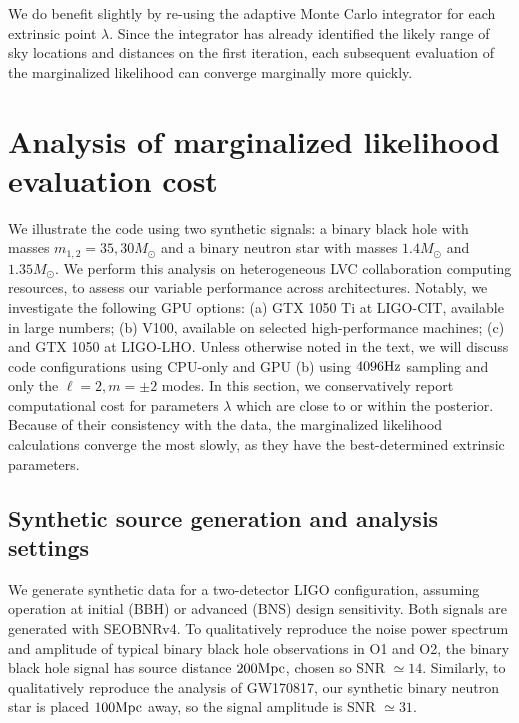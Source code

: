 \documentclass[twocolumn,prd,nofootinbib]{revtex4}
\newcommand\unit[1]{{\rm #1}}
\begin{document}
We do benefit slightly by re-using the adaptive Monte Carlo integrator for each extrinsic point $\lambda$.  Since the
integrator has already identified the likely range of sky locations and distances on the first iteration, each
subsequent evaluation of the marginalized likelihood can converge marginally more quickly.



\section{Analysis of marginalized likelihood evaluation cost}
\label{sec:demo}

We illustrate the code using two synthetic signals: a binary black hole with masses $m_{1,2}=35,30 M_\odot$ and a binary
neutron star with masses $1.4 M_\odot$ and $1.35 M_\odot$.
 We perform this analysis on heterogeneous LVC collaboration computing resources, to assess our variable
performance across architectures.  Notably, we investigate the following GPU options: (a) GTX 1050 Ti at LIGO-CIT,
available in large numbers; (b) V100, available on selected high-performance machines; (c) and
GTX 1050 at LIGO-LHO.    Unless otherwise noted in the text, we will discuss code configurations using CPU-only and GPU (b) using
$4096\unit{Hz}$ sampling and only the  $\ell=2, m=\pm 2$ modes.  In this section, we  conservatively report computational cost for
parameters $\lambda$ which are close to or within the posterior.  Because of their consistency with the data, 
the marginalized likelihood calculations converge the most slowly, as they have the best-determined extrinsic parameters.

\subsection{Synthetic source generation and analysis settings}


We generate  synthetic data for a two-detector LIGO configuration, assuming operation at  initial (BBH) or advanced (BNS) design  sensitivity.
Both signals are generated with SEOBNRv4.   
To qualitatively reproduce the noise power spectrum and amplitude of typical binary black hole observations in O1 and
O2, the binary black hole signal has source distance $200 \unit{Mpc}$, chosen so SNR $\simeq 14$.  
Similarly, to qualitatively reproduce the analysis of GW170817, our synthetic binary neutron star is placed $100
\unit{Mpc}$ away, so the signal amplitude is SNR $\simeq 31$.
\end{document}
